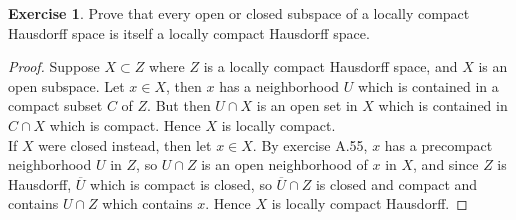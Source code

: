 \documentclass[reqno]{amsart}
\theoremstyle{plain}%
\theoremstyle{definition}
\newtheorem{exercise}[theorem]{Exercise}
\theoremstyle{remark}
\begin{document}
         \begin{exercise}
             Prove that every open or closed subspace of a locally
         compact Hausdorff space is itself a locally compact Hausdorff space.
         \end{exercise} 
         \begin{proof}
             Suppose $X \subset Z$ where $Z$ is a locally compact Hausdorff
         space, and $X$ is an open subspace. Let $x \in X$, then
         $x$ has a neighborhood $U$ which is contained in a compact subset
         $C$ of $Z$. But then $U \cap X$ is an open set in $X$ which is contained in
         $C \cap X$ which is compact. Hence $X$ is locally compact.\\
         If $X$ were closed instead, then let $x \in X$. By exercise A.55, 
         $x$ has a precompact neighborhood $U$ in $Z$, so
         $U \cap Z$ is an open neighborhood of $x$ in $X$, and
         since $Z$ is Hausdorff, $\overline{U}$ which is compact is closed, so
         $\overline{U}\cap Z$ is closed and compact and contains $U \cap Z$ which
         contains $x$. Hence
         $X$ is locally compact Hausdorff.
         \end{proof} 
\end{document}
